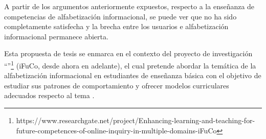 



A partir de los argumentos anteriormente expuestos, respecto a la enseñanza de competencias de alfabetización informacional, se puede ver que no ha sido completamente satisfecha y la brecha entre los usuarios e alfabetización informacional permanece abierta.

Esta propuesta de tesis se enmarca en el contexto del proyecto de investigación “”\footnote{https://www.researchgate.net/project/Enhancing-learning-and-teaching-for-future-competences-of-online-inquiry-in-multiple-domains-iFuCo} (iFuCo, desde ahora en adelante), el cual pretende abordar la temática de la alfabetización informacional en estudiantes de enseñanza básica con el objetivo de estudiar sus patrones de comportamiento y ofrecer modelos curriculares adecuados respecto al tema \parencite{sormen2017performance}.


%



